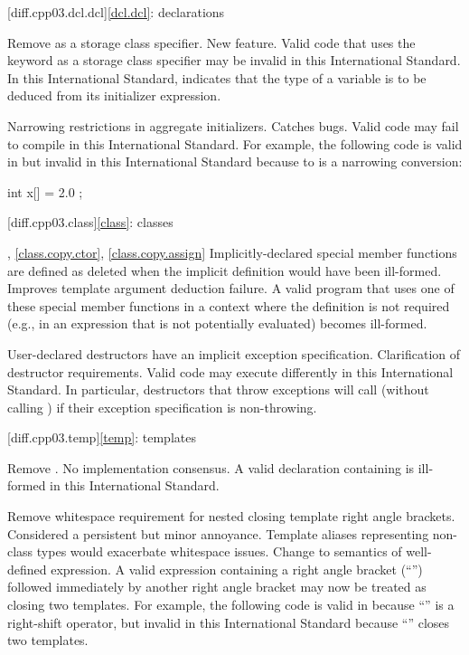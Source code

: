 [diff.cpp03.dcl.dcl]{\ref{dcl.dcl}: declarations}

\change Remove  as a storage class specifier.
\rationale New feature.
\effect
Valid \CppIII{} code that uses the keyword  as a storage class
specifier may be invalid in this International Standard. In this International
Standard,  indicates that the type of a variable is to be deduced
from its initializer expression.

\change Narrowing restrictions in aggregate initializers.
\rationale Catches bugs.
\effect
Valid \CppIII{} code may fail to compile in this International Standard. For
example, the following code is valid in \CppIII{} but invalid in this
International Standard because  to  is a narrowing
conversion:

\begin{codeblock}
int x[] = { 2.0 };
\end{codeblock}

[diff.cpp03.class]{\ref{class}: classes}

, \ref{class.copy.ctor}, \ref{class.copy.assign}
\change Implicitly-declared special member functions are defined as deleted
when the implicit definition would have been ill-formed.
\rationale Improves template argument deduction failure.
\effect
A valid \CppIII{} program that uses one of these special member functions in a
context where the definition is not required (e.g., in an expression that is
not potentially evaluated) becomes ill-formed.

\change User-declared destructors have an implicit exception specification.
\rationale Clarification of destructor requirements.
\effect
Valid \CppIII{} code may execute differently in this International Standard. In
particular, destructors that throw exceptions will call 
(without calling ) if their exception specification is
non-throwing.

[diff.cpp03.temp]{\ref{temp}: templates}

\change Remove .
\rationale No implementation consensus.
\effect
A valid \CppIII{} declaration containing  is ill-formed in this
International Standard.

\change Remove whitespace requirement for nested closing template right angle
brackets.
\rationale Considered a persistent but minor annoyance. Template aliases
representing non-class types would exacerbate whitespace issues.
\effect
Change to semantics of well-defined expression. A valid \CppIII{} expression
containing a right angle bracket (``\tcode{>}'') followed immediately by
another right angle bracket may now be treated as closing two templates.
For example, the following code is valid in \CppIII{} because ``\tcode{>>}''
is a right-shift operator, but invalid in this International Standard because
``\tcode{>>}'' closes two templates.

